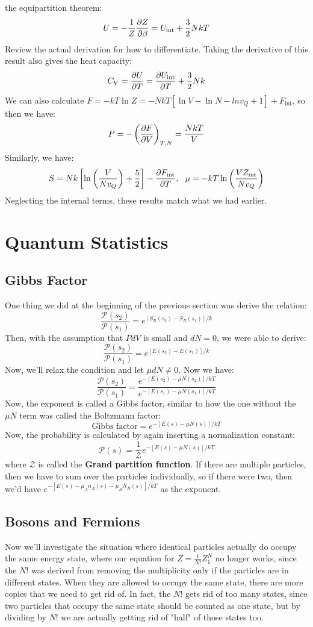 \documentclass[10pt]{article}
\renewcommand{\comment}[1]{\textcolor{blue!50}{#1}}
\begin{document}
	the equipartition theorem: 
	\[
		U = -\frac{1}{Z} \pdv{Z}{\beta} = U_{\text{int}} + \frac{3}{2} NkT
	\] 
	\comment{Review the actual derivation for how to differentiate}. Taking the derivative of this result also gives the 
	heat capacity:
	\[
		C_V = \pdv{U}{T} = \pdv{U_{\text{int}}}{T} + \frac{3}{2}Nk
	\] 
	We can also calculate \( F = -kT \ln Z = -NkT[\ln V - \ln N - ln v_Q + 1] + F_{\text{int}}\), so then we have:
	\[
		P = -\left( \pdv{F}{V} \right)_{T, N} = \frac{NkT}{V}
	\] 
	Similarly, we have:
	\[
		S = Nk\left[ \ln \left( \frac{V}{Nv_Q} \right) + \frac{5}{2} \right] - \pdv{F_{\text{int}}}{T}, \ \ \mu = -kT \ln
		\left( \frac{VZ_{\text{int}}}{Nv_Q} \right) 
	\] 
	Neglecting the internal terms, these results match what we had earlier.

	\section{Quantum Statistics} 

	\subsection{Gibbs Factor}
	One thing we did at the beginning of the previous section was derive the relation:
	\[
		\frac{\mathcal P(s_2)}{\mathcal P(s_1)} = e^{[S_R(s_2) - S_R(s_1)] / k}
	\] 
	Then, with the assumption that \( P dV \) is small and \( dN = 0 \), we were able to derive:  
	\[
		\frac{\mathcal P(s_2)}{\mathcal P(s_1)} = e^{[E(s_2) - E(s_1)] / k}
	\] 
	Now, we'll relax the condition and let \( \mu dN \neq 0 \). Now we have:
	\[
		\frac{\mathcal P(s_2)}{ \mathcal P(s_1)} = \frac{e^{-[E(s_2) - \mu N(s_2)] / kT}}{e^{-[E(s_1) - \mu N(s_1)] / kT}}
	\] 
	Now, the exponent is called a Gibbs factor, similar to how the one without the \( \mu N \) term was called the Boltzmann 
	factor:
	\[
		\text{Gibbs factor} = e^{-[E(s) - \mu N(s)] / kT}
	\] 
	Now, the probability is calculated by again inserting a normalization constant:
	\[
		\mathcal P(s) = \frac{1}{\mathcal Z} e^{-[E(s) - \mu N(s)] / kT}
	\] 
	where \( \mathcal Z \) is called the \textbf{Grand partition function}. If there are multiple particles, then we have 
	to sum over the particles individually, so if there were two, then we'd have \( e^{-[E(s) - \mu_A n_A(s)
	- \mu_B N_B(s)] / kT} \) as the exponent. 

	\subsection{Bosons and Fermions}
	Now we'll investigate the situation where identical particles actually do occupy the same energy state, where 
	our equation for \( Z = \frac{1}{N!}Z_1^{N} \) no longer works, since the \( N! \) was derived from removing 
	the multiplicity only if the particles are in different states. When they are allowed to occupy the same state, there are 
	more copies that we need to get rid of. In fact, the \( N! \) gets rid of too many states, since two particles that occupy 
	the same state should be counted as one state, but by dividing by \( N! \) we are actually getting rid of "half" of those states
	too. 
\end{document}
